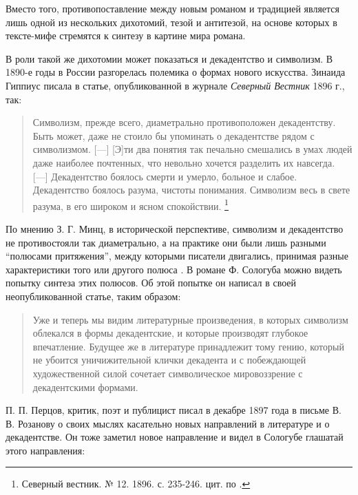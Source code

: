 \documentclass[12pt,a4paper]{article}
\begin{document}
Вместо того, противопоставление между новым романом и традицией является лишь одной из нескольких дихотомий, тезой и антитезой, на основе которых в тексте-мифе стремятся к синтезу в картине мира романа.

В роли такой же дихотомии может показаться и декадентство и символизм. В 1890-е годы в России разгорелась полемика о формах нового искусства. Зинаида Гиппиус писала в статье, опубликованной в журнале \emph{Северный Вестник} 1896 г., так:

\begin{quote}
Символизм, прежде всего, диаметрально противоположен декадентству. Быть может, даже не стоило бы упоминать о декадентстве рядом с символизмом. [---] [Э]ти два понятия так печально смешались в умах людей даже наиболее почтенных, что невольно хочется разделить их навсегда. [---] Декадентство боялось смерти и умерло, больное и слабое. Декадентство боялось разума, чистоты понимания. Символизм весь в свете разума, в его широком и ясном спокойствии. \footnote{Северный вестник. № 12. 1896. с. 235-246. цит. по \cite[150]{pavlova2007}.}

%
%
\end{quote}

По мнению З. Г. Минц, в исторической перспективе, символизм и декадентство не противостояли так диаметрально, а на практике они были лишь разными \enquote{полюсами притяжения}, между которыми писатели двигались, принимая разные характеристики того или другого полюса \parencite[62]{mints2004}. В романе Ф. Сологуба можно видеть попытку синтеза этих полюсов. Об этой попытке он написал в своей неопубликованной статье, таким образом:

\begin{quote}
Уже и теперь мы видим литературные произведения, в которых символизм облекался в формы декадентские, и которые производят глубокое впечатление. Будущее же в литературе принадлежит тому гению, который не убоится уничижительной клички декадента и с побеждающей художественной силой сочетает символическое мировоззрение с декадентскими формами.

\parencite[501.]{ref:sologub2007}
\end{quote}

П. П. Перцов, критик, поэт и публицист писал в декабре 1897 года в письме В. В. Розанову о своих мыслях касательно новых направлений в литературе и о декадентстве. Он тоже заметил новое направление и видел в Сологубе глашатай этого направления:
\end{document}
